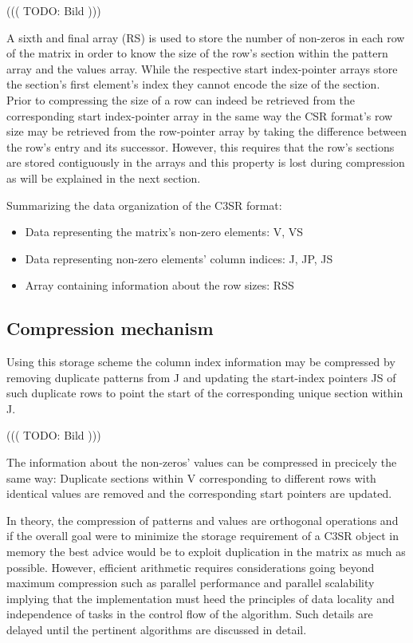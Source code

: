 \documentclass{article}
\begin{document}
      ((( TODO: Bild )))

    A sixth and final array (RS) is used to store the number of non-zeros in each row of the matrix in order to know the
    size of the row's section within the pattern array and the values array. While the respective start index-pointer
    arrays store the section's first element's index they cannot encode the size of the section. Prior to compressing
    the size of a row can indeed be retrieved from the corresponding start index-pointer array in the same way the CSR
    format's row size may be retrieved from the row-pointer array by taking the difference between the row's entry and
    its successor. However, this requires that the row's sections are stored contiguously in the arrays and this
    property is lost during compression as will be explained in the next section.

    Summarizing the data organization of the C3SR format:
    \begin{itemize}
      \item Data representing the matrix's non-zero elements: V, VS
      \item Data representing non-zero elements' column indices: J, JP, JS
      \item Array containing information about the row sizes: RSS
    \end{itemize}

  \subsection{Compression mechanism}

    Using this storage scheme the column index information may be compressed by removing duplicate patterns from J and
    updating the start-index pointers JS of such duplicate rows to point the start of the corresponding unique section
    within J.

      ((( TODO: Bild )))

    The information about the non-zeros' values can be compressed in precicely the same way: Duplicate sections within V
    corresponding to different rows with identical values are removed and the corresponding start pointers are updated.

    In theory, the compression of patterns and values are orthogonal operations and if the overall goal were to minimize
    the storage requirement of a C3SR object in memory the best advice would be to exploit duplication in the matrix as
    much as possible. However, efficient arithmetic requires considerations going beyond maximum compression such as
    parallel performance and parallel scalability implying that the implementation must heed the principles of
    data locality and independence of tasks in the control flow of the algorithm. Such details are delayed until the
    pertinent algorithms are discussed in detail.
\end{document}

